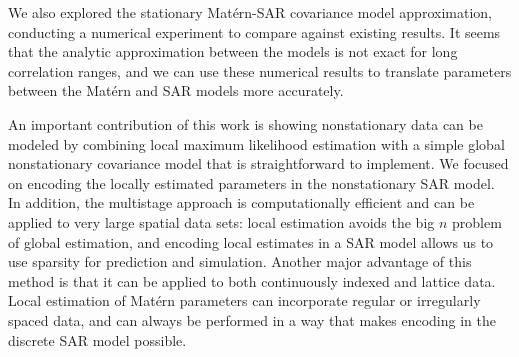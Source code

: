 \documentclass[review]{elsarticle}
\begin{document}
We also explored the stationary Mat\'ern-SAR covariance model approximation, conducting a numerical experiment to compare against existing results. It seems that the analytic approximation between the models is not exact for long correlation ranges, and we can use these numerical results to translate parameters between the Mat\'ern and SAR models more accurately.

An important contribution of this work is showing nonstationary data can be modeled by combining local maximum likelihood estimation with a simple global nonstationary covariance model that is straightforward to implement. We focused on encoding the locally estimated parameters in the nonstationary SAR model. In addition, the multistage approach is computationally efficient and can be applied to very large spatial data sets: local estimation avoids the big $n$ problem of global estimation, and encoding local estimates in a SAR model allows us to use sparsity for prediction and simulation. Another major advantage of this method is that it can be applied to both continuously indexed and lattice data. Local estimation of Mat\'ern parameters can incorporate regular or irregularly spaced data, and can always be performed in a way that makes encoding in the discrete SAR model possible.








\end{document}
